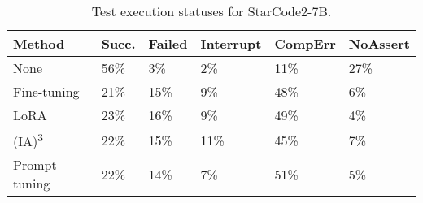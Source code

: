 \begin{table}[htbp]
    \centering
    \caption{Test execution statuses for StarCode2-7B.}
    \label{tab:test-statuses}
    \small
    \begin{tabularx}{\columnwidth}{lYYYYY}
    \toprule
    \textbf{Method} & \textbf{Succ.} & \textbf{Failed} & \textbf{Interrupt} & \textbf{CompErr} & \textbf{NoAssert} \\
    \midrule
    None & 56\% & 3\% & 2\% & 11\% & 27\% \\
    Fine-tuning & 21\% & 15\% & 9\% & 48\% & 6\% \\
    LoRA & 23\% & 16\% & 9\% & 49\% & 4\% \\
    (IA)\textsuperscript{3} & 22\% & 15\% & 11\% & 45\% & 7\% \\
    Prompt tuning & 22\% & 14\% & 7\% & 51\% & 5\% \\
    \bottomrule
    \end{tabularx}
\end{table}